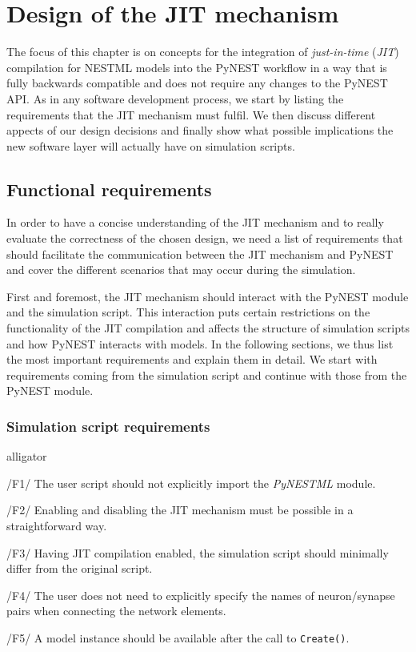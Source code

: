 
\chapter{Design of the JIT mechanism}
\label{chap:jit}

The focus of this chapter is on concepts for the integration of \emph{just-in-time} (\emph{JIT}) compilation for NESTML models into the PyNEST workflow in a way that is fully backwards compatible and does not require any changes to the PyNEST API. As in any software development process, we start by listing the requirements that the JIT mechanism must fulfil. We then discuss different appects of our design decisions and finally show what possible implications the new software layer will actually have on simulation scripts.

\section{Functional requirements}

In order to have a concise understanding of the JIT mechanism and to really evaluate the correctness of the chosen design, we need a list of requirements that should facilitate the communication between the JIT mechanism and PyNEST and cover the different scenarios that may occur during the simulation.

First and foremost, the JIT mechanism should interact with the PyNEST module and the simulation script. This interaction puts certain restrictions on the functionality of the JIT compilation and affects the structure of simulation scripts and how PyNEST interacts with models. In the following sections, we thus list the most important requirements and explain them in detail. We start with requirements coming from the simulation script and continue with those from the PyNEST module.

\subsection*{Simulation script requirements}

\begin{labeling}{alligator}
   \item[/F1/] The user script should not explicitly import the \emph{PyNESTML} module.
   \item[/F2/] Enabling and disabling the JIT mechanism must be possible in a straightforward way.
   \item[/F3/] Having JIT compilation enabled, the simulation script should minimally differ from the original script.
   \item[/F4/]\label{req:F4} The user does not need to explicitly specify the names of neuron/synapse pairs when connecting the network elements.
   \item[/F5/] A model instance should be available after the call to \texttt{Create()}.
\end{labeling}

